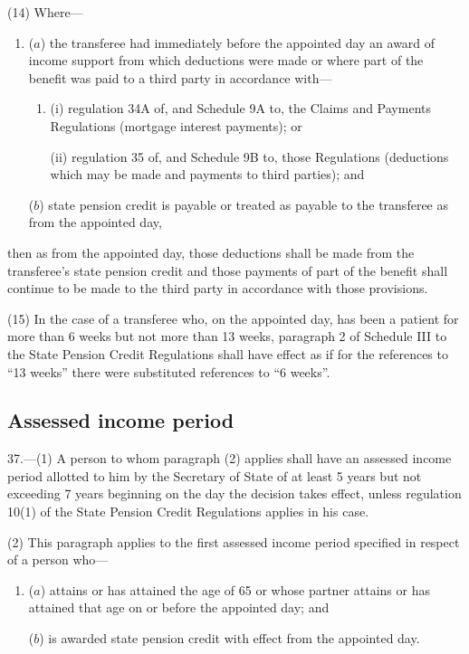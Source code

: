 \documentclass[12pt,a4paper]{article}
\begin{document}
(14) Where—
\begin{enumerate}\item[]
($a$) the transferee had immediately before the appointed day an award of income support from which deductions were made or where part of the benefit was paid to a third party in accordance with—
\begin{enumerate}\item[]
(i) regulation 34A of, and Schedule 9A to, the Claims and Payments Regulations (mortgage interest payments); or

(ii) regulation 35 of, and Schedule 9B to, those Regulations (deductions which may be made and payments to third parties); and
\end{enumerate}

($b$) state pension credit is payable or treated as payable to the transferee as from the appointed day,
\end{enumerate}
then as from the appointed day, those deductions shall be made from the transferee’s state pension credit and those payments of part of the benefit shall continue to be made to the third party in accordance with those provisions.

(15) In the case of a transferee who, on the appointed day, has been a patient for more than 6 weeks but not more than 13 weeks, paragraph 2 of Schedule III to the State Pension Credit Regulations shall have effect as if for the references to “13 weeks” there were substituted references to “6 weeks”.

\subsection[37. Assessed income period]{Assessed income period}

37.---(1)  A person to whom paragraph (2) applies shall have an assessed income period allotted to him by the Secretary of State of at least 5 years but not exceeding 7 years beginning on the day the decision takes effect, unless regulation 10(1) of the State Pension Credit Regulations applies in his case.

(2) This paragraph applies to the first assessed income period specified in respect of a person who—
\begin{enumerate}\item[]
($a$) attains or has attained the age of 65 or whose partner attains or has attained that age on or before the appointed day; and

($b$) is awarded state pension credit with effect from the appointed day.
\end{enumerate}
\end{document}
